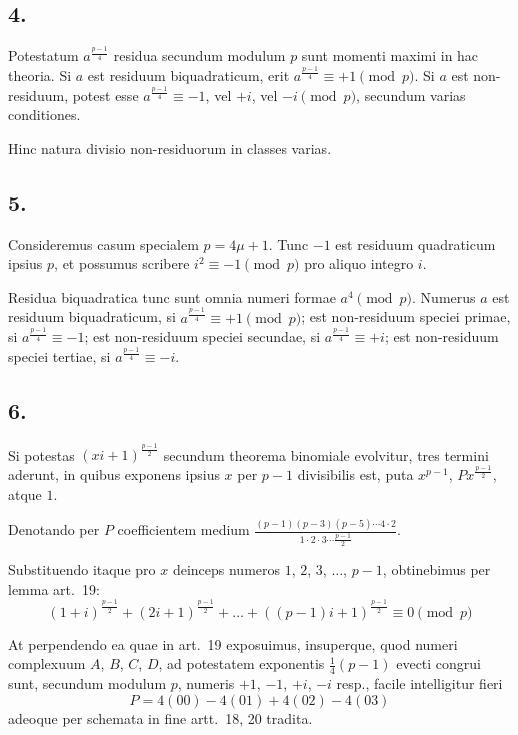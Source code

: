 \documentclass[12pt,a4paper]{article}
\theoremstyle{plain}
\theoremstyle{definition}
\theoremstyle{remark}
\begin{document}
\subsection*{4.}
Potestatum $a^{\frac{p-1}{4}}$ residua secundum modulum $p$ sunt momenti maximi in hac theoria. Si $a$ est residuum biquadraticum, erit $a^{\frac{p-1}{4}} \equiv +1 \pmod{p}$. Si $a$ est non-residuum, potest esse $a^{\frac{p-1}{4}} \equiv -1$, vel $+i$, vel $-i \pmod{p}$, secundum varias conditiones.

Hinc natura divisio non-residuorum in classes varias.

\subsection*{5.}
Consideremus casum specialem $p=4\mu+1$. Tunc $-1$ est residuum quadraticum ipsius $p$, et possumus scribere $i^2 \equiv -1 \pmod{p}$ pro aliquo integro $i$.

Residua biquadratica tunc sunt omnia numeri formae $a^4 \pmod{p}$. Numerus $a$ est residuum biquadraticum, si $a^{\frac{p-1}{4}} \equiv +1 \pmod{p}$; est non-residuum speciei primae, si $a^{\frac{p-1}{4}} \equiv -1$; est non-residuum speciei secundae, si $a^{\frac{p-1}{4}} \equiv +i$; est non-residuum speciei tertiae, si $a^{\frac{p-1}{4}} \equiv -i$.

\subsection*{6.}
Si potestas $(xi+1)^{\frac{p-1}{2}}$ secundum theorema binomiale evolvitur, tres termini aderunt, in quibus exponens ipsius $x$ per $p-1$ divisibilis est, puta $x^{p-1}$, $Px^{\frac{p-1}{2}}$, atque $1$.

Denotando per $P$ coefficientem medium $\frac{(p-1)(p-3)(p-5)\cdots 4 \cdot 2}{1 \cdot 2 \cdot 3 \cdots \frac{p-1}{2}}$.

Substituendo itaque pro $x$ deinceps numeros $1$, $2$, $3$, $\ldots$, $p-1$, obtinebimus per lemma art.~19:
\[(1+i)^{\frac{p-1}{2}} + (2i+1)^{\frac{p-1}{2}} + \ldots + ((p-1)i+1)^{\frac{p-1}{2}} \equiv 0 \pmod{p}\]

At perpendendo ea quae in art.~19 exposuimus, insuperque, quod numeri complexuum $A$, $B$, $C$, $D$, ad potestatem exponentis $\frac{1}{4}(p-1)$ evecti congrui sunt, secundum modulum $p$, numeris $+1$, $-1$, $+i$, $-i$ resp., facile intelligitur fieri
\[P = 4(00) - 4(01) + 4(02) - 4(03)\]
adeoque per schemata in fine artt.~18, 20 tradita.
\end{document}
